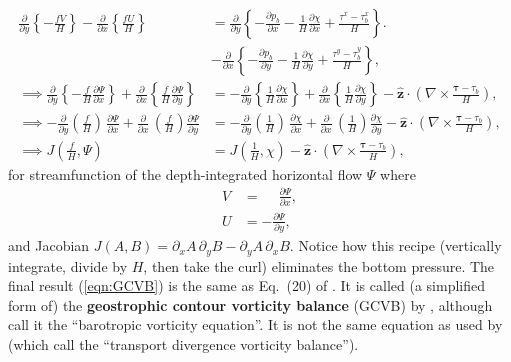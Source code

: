\documentclass[10pt]{amsart}
\begin{document}
 \begin{align}
\frac{\partial}{\partial y} \left\{- \frac{f V}{H} \right\}  - \frac{\partial}{\partial x} \left\{\frac{f  U}{H} \right\} & = 
\frac{\partial}{\partial y} \left\{ - \frac{\partial p_b}{\partial x} - \frac{1}{H} \frac{\partial \chi}{\partial x}  + \frac{\tau^x - \tau^x_b}{H} \right\} \nonumber. \\
& -  \frac{\partial}{\partial x} \left\{ - \frac{\partial p_b}{\partial y} - \frac{1}{H} \frac{\partial \chi }{\partial y}  + \frac{\tau^y - \tau^y_b}{H} \right\}, \\
\implies
\frac{\partial}{\partial y} \left\{- \frac{f }{H} \frac{\partial \Psi}{\partial x} \right\}  + \frac{\partial}{\partial x} \left\{\frac{f }{H} \frac{\partial \Psi}{\partial y} \right\} & = 
- \frac{\partial}{\partial y} \left\{ \frac{1}{H} \frac{\partial \chi}{\partial x} \right\} + \frac{\partial}{\partial x} \left\{ \frac{1}{H} \frac{\partial \chi }{\partial y}  \right\}  - {\hat{\mathbf z}} \cdot \left( \nabla \times \frac{{\mathbf \tau - \tau_b}}{H} \right), \nonumber \\
\implies
- \frac{\partial}{\partial y} \left(\frac{f }{H} \right) \, \frac{\partial \Psi}{\partial x}  + \frac{\partial}{\partial x} \, \left( \frac{f }{H}  \right) \frac{\partial \Psi}{\partial y} & = 
- \frac{\partial}{\partial y} \left( \frac{1}{H} \right) \, \frac{\partial \chi}{\partial x} + \frac{\partial}{\partial x} \, \left( \frac{1}{H} \right) \frac{\partial \chi }{\partial y}   - {\hat{\mathbf z}} \cdot \left( \nabla \times \frac{{\mathbf \tau - \tau_b}}{H} \right), \label{eqn:GCVB0} \\
\implies
J\left( \frac{f}{H} , \Psi \right)  & =  J \left( \frac{1}{H}, \chi \right)
- {\hat{\mathbf z}} \cdot \left( \nabla \times \frac{{\mathbf \tau - \tau_b}}{H} \right) ,
\label{eqn:GCVB}
\end{align}
for streamfunction of the depth-integrated horizontal flow $\Psi$ where
\begin{align}
V & = \phantom{-} \frac{\partial \Psi}{\partial x}, \nonumber \\
U & = - \frac{\partial \Psi}{\partial y} ,
\end{align}
and Jacobian $J(A,B) = \partial_x A \, \partial_y B - \partial_y A \, \partial_x B$.
Notice how this recipe (vertically integrate, divide by $H$, then take the curl) eliminates the bottom pressure.
The final result (\ref{eqn:GCVB}) is the same as Eq.~(20) of \citet{peterson&callies26}.
It is called (a simplified form of) the \textbf{geostrophic contour vorticity balance} (GCVB) by \citet{waldman&giordani23}, although \citet{peterson&callies26} call it the ``barotropic vorticity equation''.
It is not the same equation as used by \citet{nost&isachsen03} (which \citet{waldman&giordani23} call the ``transport divergence vorticity balance'').
\end{document}
